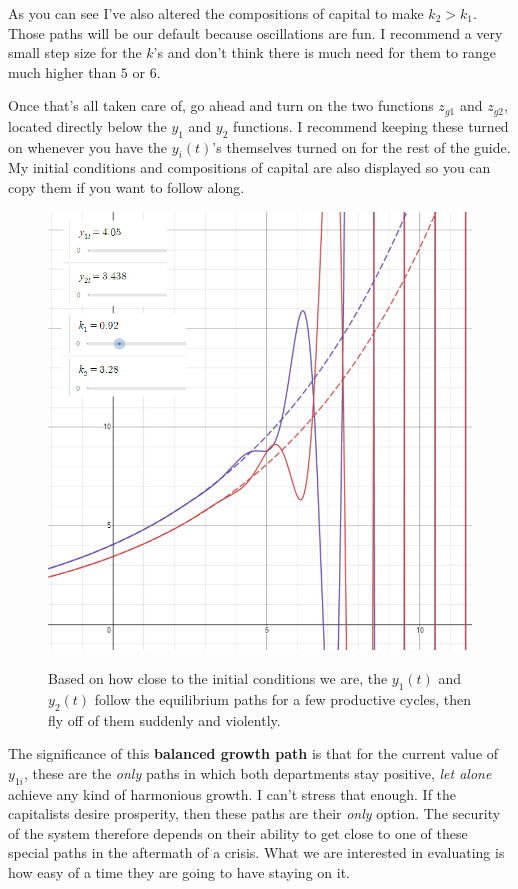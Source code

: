 \documentclass{article}
\theoremstyle{theorem}
\begin{document}
As you can see I've also altered the compositions of capital to make $k_2 > k_1$. Those paths will be our default because oscillations are fun. I recommend a very small step size for the $k$'s and don't think there is much need for them to range much higher than $5$ or $6$. \par 
Once that's all taken care of, go ahead and turn on the two functions $z_{g1}$ and $z_{g2}$, located directly below the $y_1$ and $y_2$ functions. I recommend keeping these turned on whenever you have the $y_i(t)$'s themselves turned on for the rest of the guide. My initial conditions and compositions of capital are also displayed so you can copy them if you want to follow along. 
\begin{figure}[H]
\centering
\includegraphics[scale=0.7]{Images/balancedPaths}
\label{fig:balancedGrowth}
\caption{Based on how close to the initial conditions we are, the $y_1(t)$ and $y_2(t)$ follow the equilibrium paths for a few productive cycles, then fly off of them suddenly and violently.} 
\end{figure}
The significance of this \textbf{balanced growth path} is that for the current value of $y_{1i}$, these are the \emph{only} paths in which both departments stay positive, \emph{let alone} achieve any kind of harmonious growth. I can't stress that enough. If the capitalists desire prosperity, then these paths are their \emph{only} option. The security of the system therefore depends on their ability to get close to one of these special paths in the aftermath of a crisis. What we are interested in evaluating is how easy of a time they are going to have staying on it. \par 
\end{document}
